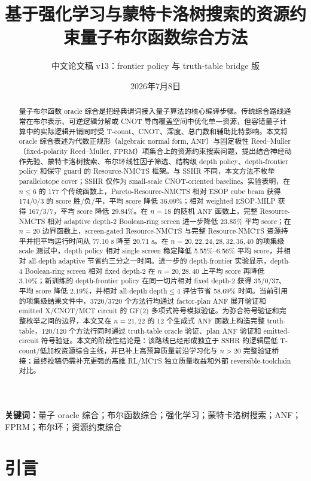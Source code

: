\documentclass[UTF8,fontset=macnew,11pt]{ctexart}
\title{基于强化学习与蒙特卡洛树搜索的资源约束量子布尔函数综合方法}
\author{中文论文稿 v13：frontier policy 与 truth-table bridge 版}
\date{2026年7月8日}
\newcommand{\method}{Resource-NMCTS}
\newcommand{\screen}{Boolean-ring screen}
\newcommand{\anf}{\ensuremath{\mathrm{ANF}}}
\newcommand{\fprm}{\ensuremath{\mathrm{FPRM}}}
\newcommand{\ttable}{truth-table}
\begin{document}
\pagestyle{plain}
\maketitle

\begin{abstract}
量子布尔函数 oracle 综合是把经典谓词接入量子算法的核心编译步骤。传统综合路线通常在布尔表示、可逆逻辑分解或 CNOT 导向覆盖空间中优化单一资源，但容错量子计算中的实际逻辑开销同时受 T-count、CNOT、深度、总门数和辅助比特影响。本文将 oracle 综合表述为代数正规形（algebraic normal form, \anf{}）与固定极性 Reed--Muller（fixed-polarity Reed--Muller, \fprm{}）项集合上的资源约束搜索问题，提出结合神经动作先验、蒙特卡洛树搜索、布尔环线性因子筛选、结构级 depth policy、depth-frontier policy 和保守 guard 的 \method{} 框架。与 SSHR 不同，本文方法不枚举 parallelotope cover；SSHR 仅作为 small-scale CNOT-oriented baseline。实验表明，在 $n\leq6$ 的 177 个传统函数上，Pareto-\method{} 相对 ESOP cube beam 获得 174/0/3 的 score 胜/负/平，平均 score 降低 36.09\%；相对 weighted ESOP-MILP 获得 167/3/7，平均 score 降低 29.84\%。在 $n=18$ 的随机 \anf{} 函数上，完整 \method{} 相对 adaptive depth-2 \screen{} 进一步降低 23.85\% 平均 score；在 $n=20$ 边界函数上，screen-gated \method{} 与完整 \method{} 资源持平并把平均运行时间从 77.10 s 降至 20.71 s。在 $n=20,22,24,28,32,36,40$ 的项集级 scale 测试中，depth policy 相对 single screen 稳定降低 5.55\%--6.56\% 平均 score，并相对 all-depth adaptive 节省约三分之一时间。进一步的 depth-frontier 实验显示，depth-4 \screen{} 相对 fixed depth-2 在 $n=20,28,40$ 上平均 score 再降低 3.10\%；新训练的 depth-frontier policy 在同一切片相对 fixed depth-2 获得 35/0/37、平均 score 降低 2.19\%，并相对 all-depth depth$\leq4$ 评估节省 58.69\% 时间。当前引用的项集级结果文件中，3720/3720 个方法行均通过 factor-plan \anf{} 展开验证和 emitted X/CNOT/MCT circuit 的 GF(2) 多项式符号模拟验证。为弥合符号验证和完整枚举之间的边界，本文又在 $n=21,22$ 的 12 个生成式 \anf{} 函数上构造完整 \ttable{}，120/120 个方法行同时通过 \ttable{} oracle 验证、plan \anf{} 验证和 emitted-circuit 符号验证。本文的阶段性结论是：该路线已经形成独立于 SSHR 的逻辑层低 T-count/低加权资源综合主线，并已补上高预算质量前沿学习化与 $n>20$ 完整验证桥接；最终投稿仍需补充更强的高维 RL/MCTS 独立质量收益和外部 reversible-toolchain 对比。
\end{abstract}

\noindent\textbf{关键词：}量子 oracle 综合；布尔函数综合；强化学习；蒙特卡洛树搜索；ANF；FPRM；布尔环；资源约束综合

\section{引言}
\end{document}
